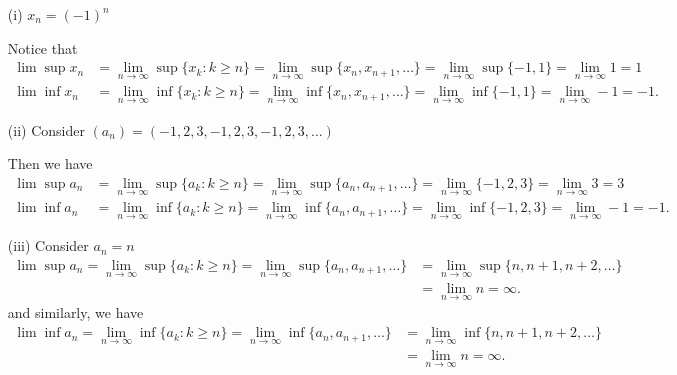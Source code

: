 \documentclass[a4paper]{article}
\begin{document}
\begin{eg}
    \begin{enumerate}
        \item[(i)] \( {x}_{n} = (-1)^{n} \)

            Notice that 
            \begin{align*}
                \lim \sup {x}_{n} &= \lim_{ n \to \infty  }  \sup \{ {x}_{k } : k \geq n  \} = \lim_{ n \to \infty  }  \sup \{ {x}_{n}, {x}_{n+1}, \dots  \}  = \lim_{ n \to \infty  }  \sup \{ -1,1 \}  = \lim_{ n \to \infty  } 1 = 1 \\
                \lim \inf {x}_{n} &= \lim_{ n \to \infty  }  \inf \{ {x}_{k } : k \geq n  \} = \lim_{ n \to \infty  }  \inf \{ {x}_{n} , {x}_{n+1}, \dots  \}  = \lim_{ n \to \infty  }  \inf \{ -1, 1  \} = \lim_{ n \to \infty   }  - 1 = -1. 
            \end{align*}
        \item[(ii)] Consider \( ({a}_{n}) = (-1,2,3,-1,2,3,-1,2,3,\dots) \)

            Then we have
            \begin{align*}
                \lim \sup  {a}_{n} &= \lim_{ n \to \infty  }  \sup \{ {a}_{k } : k  \geq n \} = \lim_{ n \to \infty  }  \sup \{ {a}_{n}, {a}_{n+1}, \dots  \}  = \lim_{ n \to \infty  }  \{  - 1 , 2 , 3 \}  = \lim_{ n \to \infty  } 3 =  3 \\
            \lim \inf {a}_{n} &= \lim_{ n \to \infty  }  \inf \{ {a}_{k } : k \geq n  \}  = \lim_{ n \to \infty  }  \inf \{ {a}_{n} , {a}_{n+1}, \dots  \} = \lim_{ n \to \infty  }  \inf \{ -1 , 2,3 \} = \lim_{ n \to \infty  }  - 1 = -1.
            \end{align*}
        \item[(iii)] Consider \( {a}_{n} = n  \)
            \begin{align*}
                \lim \sup  {a}_{n} = \lim_{ n \to \infty  }  \sup \{ {a}_{k } : k \geq n  \} = \lim_{ n \to \infty  }  \sup \{ {a}_{n}, {a}_{n+1}, \dots  \}  &= \lim_{ n \to \infty  }  \sup \{ n , n + 1 , n + 2, \dots  \}  \\
                                                                                                                                                              &= \lim_{ n \to \infty  } n = \infty. 
            \end{align*}
            and similarly, we have
            \begin{align*}
                \lim \inf {a}_{n} = \lim_{ n \to \infty  }  \inf \{ {a}_{k } : k \geq n  \} = \lim_{ n \to \infty  }  \inf \{ {a}_{n}, {a}_{n+1}, \dots  \} &= \lim_{ n \to \infty  }  \inf \{ n, n + 1 , n + 2 , \dots \}  \\
                &= \lim_{ n \to \infty  } n = \infty. 
            \end{align*}
    \end{enumerate}
\end{eg}
\end{document}
